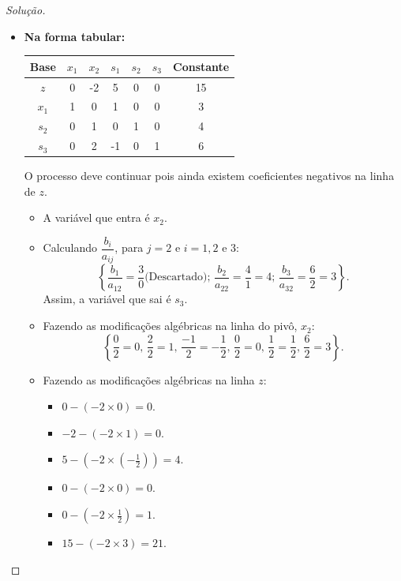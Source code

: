 \documentclass[
	12pt,				%
	openright,			%
	twoside,			%
	a4paper,			%
	english,			%
	french,				%
	brazil,				%
	sumario=tradicional
]{abntex2}
\newenvironment{solution}{
	\begin{proof}[Solução]
}{\end{proof}}
\numberwithin{example}{chapter}
\numberwithin{remark}{chapter}
\numberwithin{definition}{chapter}
\numberwithin{figure}{chapter}
\begin{document}
\begin{solution}
	\begin{itemize}		
		\item \textbf{Na forma tabular:}
		\begin{table}[h]
			\centering
			\begin{tabular}{|c|c|c|c|c|c|c|}
				\hline
				Base & $x_1$ & $x_2$ & $s_1$ & $s_2$ & $s_3$ & Constante \\
		        \hline
		        $z$ & 0 & -2 & 5 & 0 & 0 & 15\\
		        \hline
		        $x_1$ & 1 & 0 & 1 & 0 & 0 & 3\\
		        \hline
		        $s_2$ & 0 & 1 & 0 & 1 & 0 & 4\\
		        \hline
		        $s_3$ & 0 & 2 & -1 & 0 & 1 & 6\\
		        \hline
			\end{tabular}
		\end{table}
			
		O processo deve continuar pois ainda existem coeficientes negativos na linha de $z$.
		
		\begin{itemize}
			\item A variável que entra é $x_2$.
			
			\item Calculando $\dfrac{b_i}{a_{ij}}$, para $j=2$ e $i=1,2$ e $3$:
			$$
			    \left \{
			        \dfrac{b_1}{a_{12}}=\dfrac{3}{0}\text{(Descartado); }
			        \dfrac{b_2}{a_{22}}=\dfrac{4}{1}=4\text{; }
			        \dfrac{b_3}{a_{32}}=\dfrac{6}{2}=3
			    \right \}\text{.}
			$$
			Assim, a variável que sai é $s_3$.
			
			\item Fazendo as modificações algébricas na linha do pivô, $x_2$:
			$$
			    \left \{
			        \dfrac{0}{2}=0\text{, }
			        \dfrac{2}{2}=1\text{, }
			        \dfrac{-1}{2}=-\dfrac{1}{2}\text{, }
			        \dfrac{0}{2}=0\text{, }
			        \dfrac{1}{2}=\dfrac{1}{2}\text{, }
			        \dfrac{6}{2}=3
			    \right \}\text{.}
			$$
			
			\item Fazendo as modificações algébricas na linha $z$:
			\begin{itemize}
				\item $0-(-2\times 0)=0$.
				\item $-2-(-2\times 1)=0$.
				\item $5-(-2\times(-\frac{1}{2}))=4$.
				\item $0-(-2\times 0)=0$.
				\item $0-(-2\times \frac{1}{2})=1$.
				\item $15-(-2\times 3)=21$.
			\end{itemize}
			

\end{itemize}
\end{itemize}
\end{solution}
\end{document}
